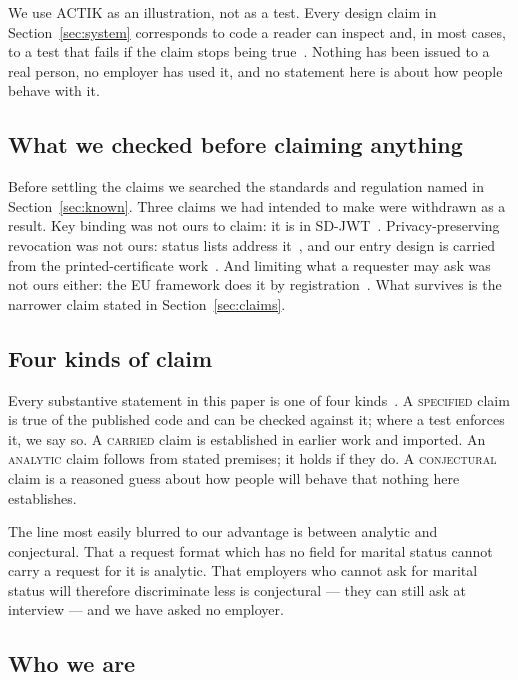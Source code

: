 \documentclass[10pt,a4paper,twocolumn]{article}
\newcommand{\kind}[1]{\textsc{#1}}
\begin{document}
We use ACTIK as an illustration, not as a test. Every design claim in
Section~\ref{sec:system} corresponds to code a reader can inspect and, in most
cases, to a test that fails if the claim stops being true~\citep{actik2026repo}.
Nothing has been issued to a real person, no employer has used it, and no
statement here is about how people behave with it.

\subsection{What we checked before claiming anything}

Before settling the claims we searched the standards and regulation named in
Section~\ref{sec:known}. Three claims we had intended to make were
withdrawn as a result. Key binding was not ours to claim: it is in
SD-JWT~\citep{rfc9901}. Privacy-preserving revocation was not ours: status lists
address it~\citep{bitstring}, and our entry design is carried from the
printed-certificate work~\citep{chay2026qrseal}. And limiting what a requester
may ask was not ours either: the EU framework does it by
registration~\citep{eu2025848}. What survives is the narrower claim stated in
Section~\ref{sec:claims}.

\subsection{Four kinds of claim}
\label{sec:fourkinds}

Every substantive statement in this paper is one of four
kinds~\citep{chay2026precinct}. A \kind{specified} claim is true of the published
code and can be checked against it; where a test enforces it, we say so. A
\kind{carried} claim is established in earlier work and imported. An
\kind{analytic} claim follows from stated premises; it holds if they do. A
\kind{conjectural} claim is a reasoned guess about how people will behave that
nothing here establishes.

The line most easily blurred to our advantage is between analytic and
conjectural. That a request format which has no field for marital status cannot
carry a request for it is analytic. That employers who cannot ask for marital
status will therefore discriminate less is conjectural --- they can still ask at
interview --- and we have asked no employer.

\subsection{Who we are}
\end{document}
